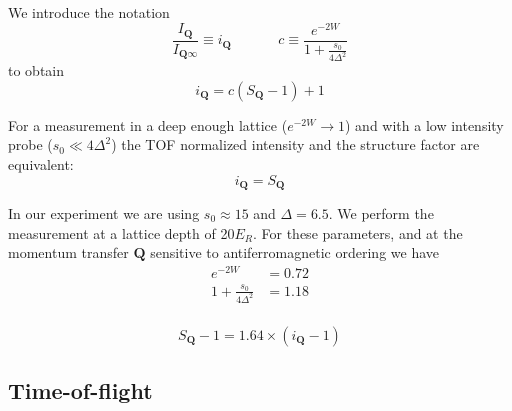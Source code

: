 \documentclass[11pt,letter]{article}
\newcommand{\bv}[1]{\ensuremath{\bm{#1}}}
\newcommand{\iisat}{\ensuremath{I_{\mathrm{p}}/I_{\mathrm{sat}}}}
\newcommand{\Iqtof}{\ensuremath{I_{\bv{Q}\infty} }}
\newcommand{\Iq}{\ensuremath{I_{\bv{Q}} }}
\newcommand{\iq}{\ensuremath{i_{\bv{Q}} }}
\begin{document}
We introduce the notation
\begin{equation}
 \frac{\Iq}{\Iqtof} \equiv \iq 
   \ \ \ \ \ \ \  \ \ \ \ \ \ \ \  
      c \equiv 
    \frac{ e^{-2W}}
           {1+\frac{ s_{0}}{ 4\Delta^{2}} } 
\end{equation} 
%
to obtain
\begin{equation}
  \iq = c ( S_{\bv{Q}} - 1 ) + 1 
\end{equation}

For a measurement in a deep enough lattice ($e^{-2W}\rightarrow 1$) and with a
low intensity probe ($ s_{0} \ll 4\Delta^{2} $) the  TOF normalized intensity
and the structure factor are equivalent:
\begin{equation}
  \iq = S_{\bv{Q}} 
\end{equation}

In our experiment we are using $s_{0} \approx 15$ and $\Delta = 6.5$.   We
perform the measurement at a lattice depth of 20$E_{R}$.  For these parameters,
and at the momentum transfer $\bv{Q}$ sensitive to antiferromagnetic ordering
we have
\begin{equation}
\begin{split}
  e^{-2W} & =  0.72\\
  1  +   \frac{s_{0}}{4\Delta^{2} } & =  1.18\\  
\end{split}
\end{equation} 

\begin{equation} 
  S_{\bv{Q}} - 1  =   1.64 \times (\iq - 1)
\end{equation}

\subsection{Time-of-flight} 
\end{document}
